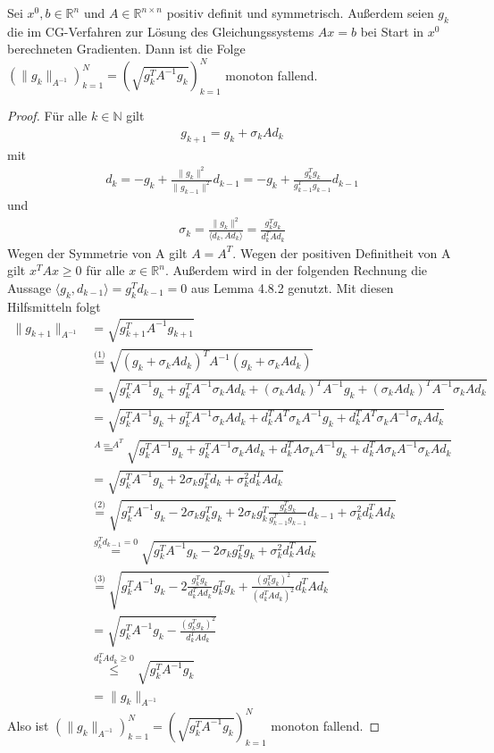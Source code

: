 
Sei $x^0, b\in\mathbb R^n$ und $A\in\mathbb R^{n\times n}$ positiv definit und symmetrisch. Außerdem seien $g_k$ die im CG-Verfahren zur Lösung des Gleichungssystems $Ax=b$ bei Start in $x^0$ berechneten Gradienten. Dann ist die Folge $(\|g_k\|_{A^{-1}})_{k=1}^N=\left(\sqrt{g_k^TA^{-1}g_k}\right)_{k=1}^N$ monoton fallend.
  
\begin{proof}
Für alle $k\in\mathbb N$ gilt 
\begin{align}g_{k+1}=g_k+\sigma_kAd_k\end{align}
mit
\begin{align}d_k=-g_k+\frac{\|g_k\|^2}{\|g_{k-1}\|^2}d_{k-1}=-g_k+\frac{g_k^Tg_k}{g_{k-1}^Tg_{k-1}}d_{k-1}\end{align}
und
\begin{align}\sigma_k=\frac{\|g_k\|^2}{\langle d_k, Ad_k\rangle}=\frac{g_k^Tg_k}{d_k^TAd_k}\end{align}
Wegen der Symmetrie von A gilt $A=A^T$. Wegen der positiven Definitheit von A gilt $x^TAx\geq 0$ für alle $x\in \mathbb R^n$. Außerdem wird in der folgenden Rechnung die Aussage $\langle g_k,d_{k-1}\rangle=g_k^Td_{k-1}=0$ aus Lemma 4.8.2 genutzt. Mit diesen Hilfsmitteln folgt
\begin{align*}
\|g_{k+1}\|_{A^{-1}}&=\sqrt{g_{k+1}^TA^{-1}g_{k+1}}\\
&\overset{\text{(1)}}=\sqrt{(g_k+\sigma_kAd_k)^TA^{-1}(g_k+\sigma_kAd_k)}\\
&=\sqrt{g_k^TA^{-1}g_k+g_k^TA^{-1}\sigma_kAd_k+(\sigma_kAd_k)^TA^{-1}g_k+(\sigma_kAd_k)^TA^{-1}\sigma_kAd_k}\\
&=\sqrt{g_k^TA^{-1}g_k+g_k^TA^{-1}\sigma_kAd_k+d_k^TA^T\sigma_kA^{-1}g_k+d_k^TA^T\sigma_kA^{-1}\sigma_kAd_k}\\
&\overset{A=A^T}=\sqrt{g_k^TA^{-1}g_k+g_k^TA^{-1}\sigma_kAd_k+d_k^TA\sigma_kA^{-1}g_k+d_k^TA\sigma_kA^{-1}\sigma_kAd_k}\\
&=\sqrt{g_k^TA^{-1}g_k+2\sigma_kg_k^Td_k+\sigma_k^2d_k^TAd_k}\\
&\overset{\text{(2)}}=\sqrt{g_k^TA^{-1}g_k-2\sigma_kg_k^Tg_k+2\sigma_kg_k^T\frac{g_k^Tg_k}{g_{k-1}^Tg_{k-1}}d_{k-1}+\sigma_k^2d_k^TAd_k}\\
&\overset{g_k^Td_{k-1}=0}=\sqrt{g_k^TA^{-1}g_k-2\sigma_kg_k^Tg_k+\sigma_k^2d_k^TAd_k}\\
&\overset{\text{(3)}}=\sqrt{g_k^TA^{-1}g_k-2\frac{g_k^Tg_k}{d_k^TAd_k}g_k^Tg_k+\frac{(g_k^Tg_k)^2}{(d_k^TAd_k)^2}d_k^TAd_k}\\
&=\sqrt{g_k^TA^{-1}g_k-\frac{(g_k^Tg_k)^2}{d_k^TAd_k}}\\
&\overset{d_k^TAd_k\geq 0}\leq \sqrt{g_k^TA^{-1}g_k}\\
&=\|g_k\|_{A^{-1}}
\end{align*}
Also ist $(\|g_k\|_{A^{-1}})_{k=1}^N=\left(\sqrt{g_k^TA^{-1}g_k}\right)_{k=1}^N$ monoton fallend.
\end{proof}